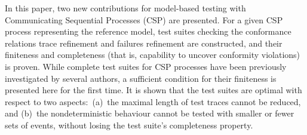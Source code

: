 In this paper, two new contributions for model-based testing with
Communicating Sequential Processes (CSP) are presented. For a given CSP
process representing the reference model, test suites checking the
conformance relations trace refinement and failures refinement are constructed, and
their finiteness and completeness (that is, capability to uncover conformity
violations) is proven. While complete test suites for CSP processes have been
previously investigated by several authors, a sufficient condition for their
finiteness is presented here for the first time.
It is shown that the test suites are optimal with respect to two
aspects:~(a)~the maximal length of test traces cannot be reduced, and (b)~the
nondeterministic behaviour cannot be tested with smaller or fewer sets of
events, without losing the test suite's completeness property.
